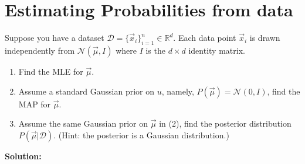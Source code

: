\documentclass[11pt]{article}
\begin{document}
		\section*{Estimating Probabilities from data}
		Suppose you have a dataset $\mathcal{D} = \{\vec{x}_i\}_{i=1}^n \in \mathbb{R}^d$. Each data point $\vec{x}_i$ is drawn independently from $\mathcal{N}(\vec{\mu}, I)$ where $I$ is the $d \times d$ identity matrix.
		\begin{enumerate}
			\item Find the MLE for $\vec{\mu}$.
			\item Assume a standard Gaussian prior on $u$, namely, $P(\vec{\mu}) = \mathcal{N}(0, I)$, find the MAP for $\vec{\mu}$.
			\item Assume the same Gaussian prior on $\vec{\mu}$ in (2), find the posterior distribution $P(\vec{\mu} | \mathcal{D})$. (Hint: the posterior is a Gaussian distribution.)
		\end{enumerate}
		
		\textbf{Solution: }
		
\end{document}
